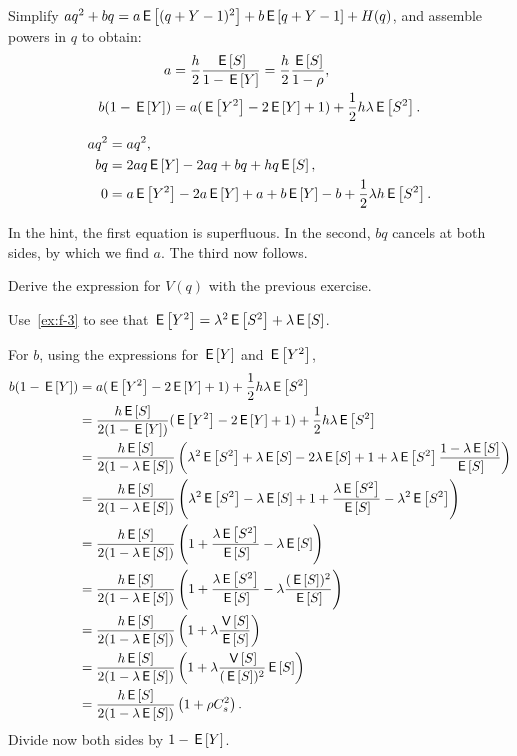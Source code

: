 \begin{exercise}\label{ex:68}
Simplify $a q^2 +b q = a\E{(q+Y-1)^2} + b\E{q+Y-1}+ H(q)$, and assemble powers in $q$ to obtain:
\begin{align*}
  a &= \frac h 2 \frac{\E S}{1-\E Y} = \frac{h}{2} \frac{\E S}{1- \rho}, \\
  b(1-\E Y) &= a(\E{Y^2} - 2 \E Y + 1) + \frac 12 h \lambda \E{S^2}.
\end{align*}
\begin{hint}
\begin{align*}
  a q^2 &= a q^2, \\
  b q &= 2a q \E Y - 2a q + b q + h q \E S,\\
  0 &= a \E{Y^2} - 2a \E Y + a + b \E Y - b + \frac 12 \lambda h \E{S^2}.
\end{align*}
\end{hint}
\begin{solution}
  In the hint, the first equation is superfluous.
  In the second, $bq$ cancels at both sides, by which we find $a$.
  The third now follows.
\end{solution}
\end{exercise}

\begin{exercise}\label{ex:nm-2}
Derive
 the expression for $V(q)$ with the previous exercise.
\begin{hint}
Use~\cref{ex:f-3} to see that $\E{Y^2} = \lambda^2 \E{S^2} + \lambda \E S$.
\end{hint}
\begin{solution}
  For $b$, using the expressions for $\E Y$ and $\E{Y^2}$,
\begin{align*}
b(1-\E Y) &= a(\E{Y^2} - 2 \E Y + 1) + \frac 12 h \lambda \E{S^2} \\
&= \frac{h \E S}{2(1-\E Y)} (\E{Y^2} - 2 \E Y + 1) + \frac 12 h \lambda \E{S^2} \\
&= \frac{h \E S}{2(1-\lambda \E S)} \left(\lambda^2 \E{S^2} + \lambda \E S - 2 \lambda \E S + 1 +  \lambda \E{S^2}\frac{1-\lambda \E S}{\E S}\right) \\
&= \frac{h \E S}{2(1-\lambda \E S)} \left(\lambda^2 \E{S^2} - \lambda \E S + 1 +  \frac{\lambda \E{S^2}}{\E S} - \lambda^2 \E{S^2}\right) \\
&= \frac{h \E S}{2(1-\lambda \E S)} \left(1+ \frac{\lambda \E{S^2}}{\E S }  - \lambda \E S \right) \\
&= \frac{h \E S}{2(1-\lambda \E S)} \left( 1+ \frac{\lambda \E{S^2}}{\E S }  - \lambda \frac{(\E S)^2}{\E S}\right) \\
&= \frac{h \E S}{2(1-\lambda \E S)} \left( 1+ \lambda \frac{\V{S}}{\E S }\right)\\
&= \frac{h \E S}{2(1-\lambda \E S)} \left( 1+ \lambda \frac{\V{S}}{(\E S)^2 } \E S\right)\\
&= \frac{h \E S}{2(1-\lambda \E S)} \left( 1+ \rho C_s^2\right).
\end{align*}
Divide now both sides by $1-\E Y$.
\end{solution}
\end{exercise}

